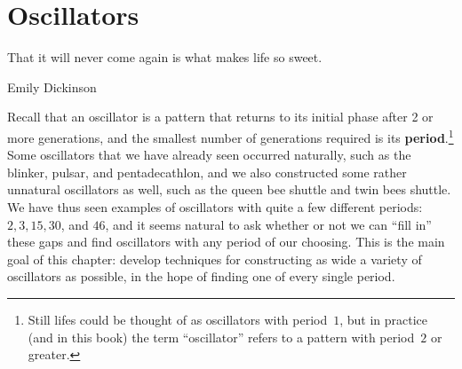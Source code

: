 
\renewcommand{\chapterfolder}{oscillators/}
\chapter{Oscillators}\label{chp:oscillators}


\vspace*{-0.4in}
\epigraph{That it will never come again is what makes life so sweet.}{Emily Dickinson}
\vspace*{0.4in}


\noindent Recall that an oscillator is a pattern that returns to its initial phase after 2 or more generations, and the smallest number of generations required is its \textbf{period}.\footnote{Still lifes could be thought of as oscillators with period~$1$, but in practice (and in this book) the term ``oscillator'' refers to a pattern with period~$2$ or greater.} Some oscillators that we have already seen occurred naturally, such as the blinker, pulsar, and pentadecathlon, and we also constructed some rather unnatural oscillators as well, such as the queen bee shuttle and twin bees shuttle. We have thus seen examples of oscillators with quite a few different periods: $2, 3, 15, 30$, and $46$, and it seems natural to ask whether or not we can ``fill in'' these gaps and find oscillators with any period of our choosing. This is the main goal of this chapter: develop techniques for constructing as wide a variety of oscillators as possible, in the hope of finding one of every single period.

